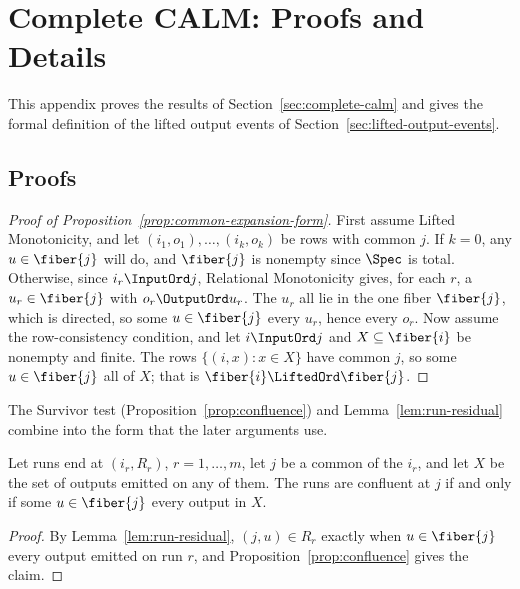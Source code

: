 \section{Complete CALM: Proofs and Details}
\label{app:proofs-sec3}

This appendix proves the results of Section~\ref{sec:complete-calm} and gives the formal
definition of the lifted output events of Section~\ref{sec:lifted-output-events}.

\subsection{Proofs}

\begin{proof}[Proof of Proposition~\ref{prop:common-expansion-form}]
First assume Lifted Monotonicity, and let $(i_1,o_1),\ldots,(i_k,o_k)$ be
rows with common \indesc $j$.  If $k=0$, any $u\in\fiber{j}$ will do, and
$\fiber{j}$ is nonempty since $\Spec$ is total.  Otherwise, since
$i_r\InputOrd j$, Relational Monotonicity gives, for each $r$, a
$u_r\in\fiber{j}$ with $o_r\OutputOrd u_r$.  The $u_r$ all lie in the one
fiber $\fiber{j}$, which is directed, so some $u\in\fiber{j}$ \outrel every
$u_r$, hence every $o_r$.  Now assume the row-consistency condition, and let
$i\InputOrd j$ and $X\subseteq\fiber{i}$ be nonempty and finite.  The rows $\{(i,x):x\in X\}$
have common \indesc $j$, so some $u\in\fiber{j}$ \outrel all of $X$; that is
$\fiber{i}\LiftedOrd\fiber{j}$.
\end{proof}

The Survivor test (Proposition~\ref{prop:confluence}) and
Lemma~\ref{lem:run-residual} combine into the form that the later arguments
use.

\begin{lemma}[Reconciliation]
\label{lem:reconciliation}
Let runs end at $(i_r,R_r)$, $r=1,\ldots,m$, let $j$ be a common \indesc of
the $i_r$, and let $X$ be the set of outputs emitted on any of them.  The runs
are confluent at $j$ if and only if some $u\in\fiber{j}$ \outrel every output
in $X$.
\end{lemma}

\begin{proof}
By Lemma~\ref{lem:run-residual}, $(j,u)\in R_r$ exactly when $u\in\fiber{j}$
\outrel every output emitted on run $r$, and Proposition~\ref{prop:confluence}
gives the claim.
\end{proof}

